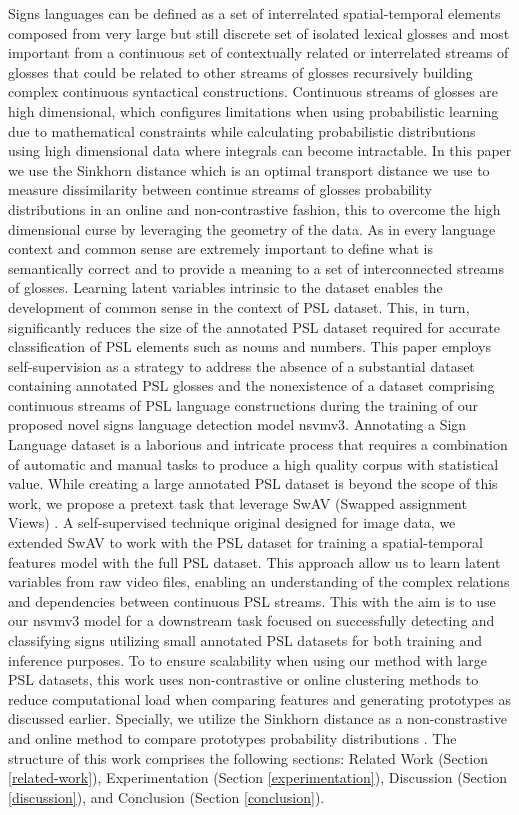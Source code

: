 \documentclass[twocolumn,conference]{article}
\begin{document}
Signs languages can be defined as a set of interrelated spatial-temporal elements composed from very large but still discrete set of isolated lexical glosses and most important from a continuous set of contextually related or interrelated streams of glosses that could be related to other streams of glosses recursively building complex continuous syntactical constructions.  
Continuous streams of glosses are high dimensional, which configures limitations when using probabilistic learning due to mathematical constraints while calculating probabilistic distributions using high dimensional data where integrals can become intractable\cite{kingma2022autoencoding}. In this paper we use the Sinkhorn distance which is an optimal transport distance we use to measure dissimilarity between continue streams of glosses probability distributions in an online and non-contrastive fashion, this to overcome the high dimensional curse by leveraging the geometry of the data.
As in every language context and common sense are extremely important to define what is semantically correct and to provide a meaning to a set of interconnected streams of glosses. Learning latent variables intrinsic to the dataset enables the development of common sense in the context of PSL dataset. This, in turn, significantly reduces the size of the annotated PSL dataset required for accurate classification of PSL elements such as nouns and numbers.
This paper employs self-supervision as a strategy to address the absence of a substantial dataset containing annotated PSL glosses and the nonexistence of a dataset comprising continuous streams of PSL language constructions during the training of our proposed novel signs language detection model nsvmv3. Annotating a Sign Language dataset is a laborious and intricate process that requires a combination of automatic and manual tasks to produce a high quality corpus with statistical value. While creating a large annotated PSL dataset is beyond the scope of this work, we propose a pretext task that leverage SwAV (Swapped assignment Views) \cite{caron2020unsupervised}. A self-supervised technique original designed for image data, we extended SwAV to work with the PSL dataset for training a spatial-temporal features model with the full PSL dataset. This approach allow us to learn latent variables from raw video files, enabling an understanding of the complex relations and dependencies between continuous PSL streams. This with the aim is to use our nsvmv3 model for a downstream task focused on successfully detecting and classifying signs utilizing small annotated PSL datasets for both training and inference purposes.
To to ensure scalability when using our method with large PSL datasets, this work uses non-contrastive or online clustering methods to reduce computational load when comparing features and generating prototypes as discussed earlier. Specially, we utilize the Sinkhorn distance as a non-constrastive and online method to compare prototypes probability distributions \cite{caron2020unsupervised}. 
The structure of this work comprises the following sections: Related Work (Section \ref{related-work}), Experimentation (Section \ref{experimentation}), Discussion (Section \ref{discussion}), and Conclusion (Section \ref{conclusion}).
\end{document}
